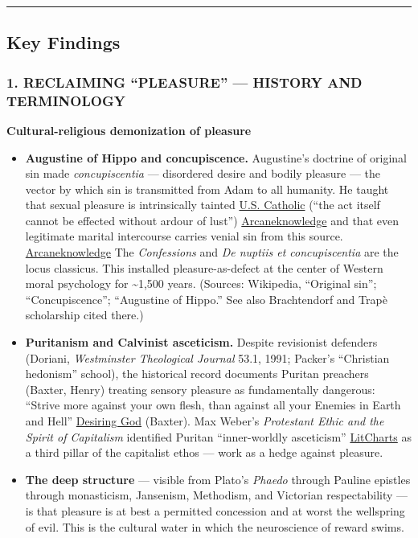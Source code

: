 \begin{center}\rule{0.5\linewidth}{0.5pt}\end{center}

\subsection{Key Findings}\label{07_pleasure_and_self-key-findings}

\subsubsection{1. RECLAIMING ``PLEASURE'' --- HISTORY AND TERMINOLOGY}\label{07_pleasure_and_self-reclaiming-pleasure-history-and-terminology}

\textbf{Cultural-religious demonization of pleasure}

\begin{itemize}
\tightlist
\item
  \textbf{Augustine of Hippo and concupiscence.} Augustine's doctrine of original sin made \emph{concupiscentia} --- disordered desire and bodily pleasure --- the vector by which sin is transmitted from Adam to all humanity. He taught that sexual pleasure is intrinsically tainted \href{https://uscatholic.org/articles/202411/what-did-st-augustine-say-about-original-sin/}{U.S. Catholic} (``the act itself cannot be effected without ardour of lust'') \href{https://www.arcaneknowledge.org/catholic/original5.htm}{Arcaneknowledge} and that even legitimate marital intercourse carries venial sin from this source. \href{https://www.arcaneknowledge.org/catholic/original5.htm}{Arcaneknowledge} The \emph{Confessions} and \emph{De nuptiis et concupiscentia} are the locus classicus. This installed pleasure-as-defect at the center of Western moral psychology for \textasciitilde1,500 years. (Sources: Wikipedia, ``Original sin''; ``Concupiscence''; ``Augustine of Hippo.'' See also Brachtendorf and Trapè scholarship cited there.)
\item
  \textbf{Puritanism and Calvinist asceticism.} Despite revisionist defenders (Doriani, \emph{Westminster Theological Journal} 53.1, 1991; Packer's ``Christian hedonism'' school), the historical record documents Puritan preachers (Baxter, Henry) treating sensory pleasure as fundamentally dangerous: ``Strive more against your own flesh, than against all your Enemies in Earth and Hell'' \href{https://www.desiringgod.org/messages/christian-hedonists-or-religious-prudes-the-puritans-on-sex}{Desiring God} (Baxter). Max Weber's \emph{Protestant Ethic and the Spirit of Capitalism} identified Puritan ``inner-worldly asceticism'' \href{https://www.litcharts.com/lit/the-protestant-ethic-and-the-spirit-of-capitalism/themes/puritan-asceticism}{LitCharts} as a third pillar of the capitalist ethos --- work as a hedge against pleasure.
\item
  \textbf{The deep structure} --- visible from Plato's \emph{Phaedo} through Pauline epistles through monasticism, Jansenism, Methodism, and Victorian respectability --- is that pleasure is at best a permitted concession and at worst the wellspring of evil. This is the cultural water in which the neuroscience of reward swims.
\end{itemize}

